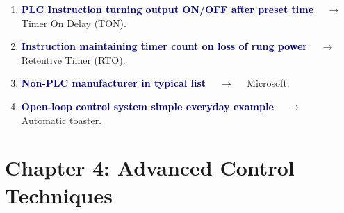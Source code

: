 \documentclass[11pt,a4paper]{article}
\begin{document}
\begin{enumerate}[label=\arabic*., leftmargin=*, labelsep=0.8em, itemsep=0.35em, parsep=0.1em, topsep=0.2em]
  \item \textcolor{darkblue}{\textbf{PLC Instruction turning output ON/OFF after preset time}} $\quad\to\quad$ Timer On Delay (TON).
  \item \textcolor{darkblue}{\textbf{Instruction maintaining timer count on loss of rung power}} $\quad\to\quad$ Retentive Timer (RTO).
  \item \textcolor{darkblue}{\textbf{Non-PLC manufacturer in typical list}} $\quad\to\quad$ Microsoft.
  \item \textcolor{darkblue}{\textbf{Open-loop control system simple everyday example}} $\quad\to\quad$ Automatic toaster.
\end{enumerate}

\section*{Chapter 4: Advanced Control Techniques}
\end{document}
